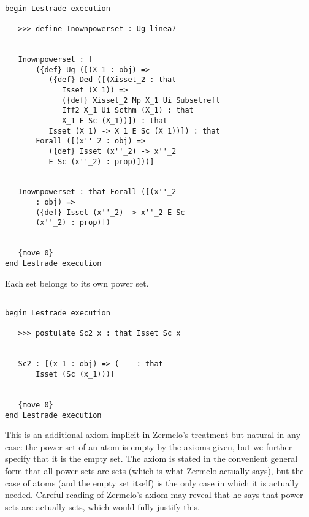 \documentclass[12pt]{article}
\begin{document}
\begin{verbatim}

begin Lestrade execution

   >>> define Inownpowerset : Ug linea7


   Inownpowerset : [
       ({def} Ug ([(X_1 : obj) => 
          ({def} Ded ([(Xisset_2 : that 
             Isset (X_1)) => 
             ({def} Xisset_2 Mp X_1 Ui Subsetrefl 
             Iff2 X_1 Ui Scthm (X_1) : that 
             X_1 E Sc (X_1))]) : that 
          Isset (X_1) -> X_1 E Sc (X_1))]) : that 
       Forall ([(x''_2 : obj) => 
          ({def} Isset (x''_2) -> x''_2 
          E Sc (x''_2) : prop)]))]


   Inownpowerset : that Forall ([(x''_2 
       : obj) => 
       ({def} Isset (x''_2) -> x''_2 E Sc 
       (x''_2) : prop)])


   {move 0}
end Lestrade execution
\end{verbatim}

Each set belongs to its own power set.

\begin{verbatim}

begin Lestrade execution

   >>> postulate Sc2 x : that Isset Sc x


   Sc2 : [(x_1 : obj) => (--- : that 
       Isset (Sc (x_1)))]


   {move 0}
end Lestrade execution
\end{verbatim}

This is an additional axiom implicit in Zermelo's treatment but natural in any case:  the power set of an atom is empty by the axioms given, but we further
specify that it is the empty set.  The axiom is stated in the convenient general form that all power sets are sets (which is what Zermelo actually says), but the case of atoms (and the empty set itself)
is the only case in which it is actually needed.  Careful reading of Zermelo's axiom may reveal that he says that power sets are actually sets, which would fully justify this.
\end{document}
